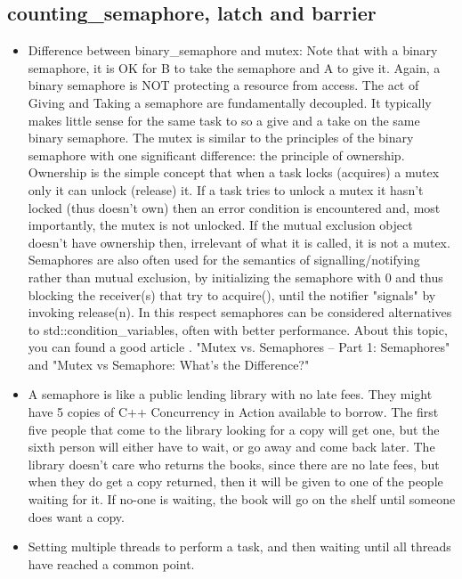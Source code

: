 \documentclass[a4paper,11pt,twoside]{book}
\begin{document}
\subsection{counting\_semaphore, latch and barrier}
\begin{itemize}

    \item Difference between binary\_semaphore and mutex: Note that with a binary semaphore, it is OK for B to take the semaphore and A to give it. Again, a binary semaphore is NOT protecting a resource from access. The act of Giving and Taking a semaphore are fundamentally decoupled. It typically makes little sense for the same task to so a give and a take on the same binary semaphore. The mutex is similar to the principles of the binary semaphore with one significant difference: the principle of ownership. Ownership is the simple concept that when a task locks (acquires) a mutex only it can unlock (release) it. If a task tries to unlock a mutex it hasn’t locked (thus doesn’t own) then an error condition is encountered and, most importantly, the mutex is not unlocked. If the mutual exclusion object doesn’t have ownership then, irrelevant of what it is called, it is not a mutex. Semaphores are also often used for the semantics of signalling/notifying rather than mutual exclusion, by initializing the semaphore with 0 and thus blocking the receiver(s) that try to acquire(), until the notifier "signals" by invoking release(n). In this respect semaphores can be considered alternatives to std::condition\_variables, often with better performance. About this topic, you can found a good article . "Mutex vs. Semaphores – Part 1: Semaphores" and "Mutex vs Semaphore: What’s the Difference?"
    
    \item A semaphore is like a public lending library with no late fees. They might have 5 copies of C++ Concurrency in Action available to borrow. The first five people that come to the library looking for a copy will get one, but the sixth person will either have to wait, or go away and come back later. The library doesn't care who returns the books, since there are no late fees, but when they do get a copy returned, then it will be given to one of the people waiting for it. If no-one is waiting, the book will go on the shelf until someone does want a copy.

	\item Setting multiple threads to perform a task, and then waiting until all threads have reached a common point.
	

\end{itemize}
\end{document}
